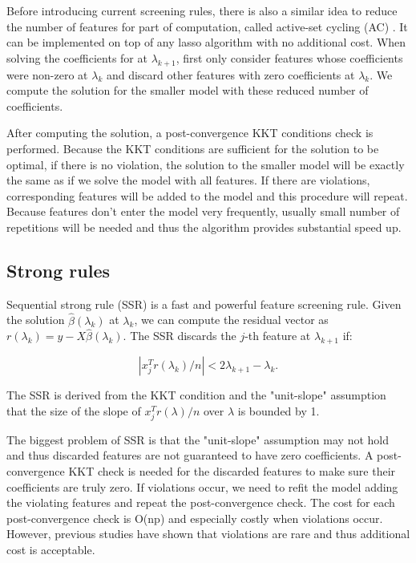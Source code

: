 \documentclass{article}
\begin{document}
Before introducing current screening rules, there is also a similar idea to reduce the number of features for part of computation, called active-set cycling (AC) \citep{lee2007efficient}. It can be implemented on top of any lasso algorithm with no additional cost. When solving the coefficients for at $\lambda_{k+1}$, first only consider features whose coefficients were non-zero at $\lambda_k$ and discard other features with zero coefficients at $\lambda_k$. We compute the solution for the smaller model with these reduced number of coefficients.

After computing the solution, a post-convergence KKT conditions check is performed. Because the KKT conditions are sufficient for the solution to be optimal, if there is no violation, the solution to the smaller model will be exactly the same as if we solve the model with all features. If there are violations, corresponding features will be added to the model and this procedure will repeat. Because features don't enter the model very frequently, usually small number of repetitions will be needed and thus the algorithm provides substantial speed up.

\subsection{Strong rules}

Sequential strong rule (SSR) \citep{tibshirani2011regression} is a fast and powerful feature screening rule. Given the solution $\hat{\beta}(\lambda_k)$ at $\lambda_k$, we can compute the residual vector as $r(\lambda_k)=y-X\hat{\beta}(\lambda_k)$. The SSR discards the $j$-th feature at $\lambda_{k+1}$ if:

\begin{equation}
    |x_j^Tr(\lambda_k)/n|<2\lambda_{k+1}-\lambda_k.
\end{equation}

The SSR is derived from the KKT condition and the "unit-slope" assumption that the size of the slope of $x_j^Tr(\lambda)/n$ over $\lambda$ is bounded by 1. 

The biggest problem of SSR is that the "unit-slope" assumption may not hold and thus discarded features are not guaranteed to have zero coefficients. A post-convergence KKT check is needed for the discarded features to make sure their coefficients are truly zero. If violations occur, we need to refit the model adding the violating features and repeat the post-convergence check. The cost for each post-convergence check is O(np) and especially costly when violations occur. However, previous studies have shown that violations are rare and thus additional cost is acceptable.
\end{document}
